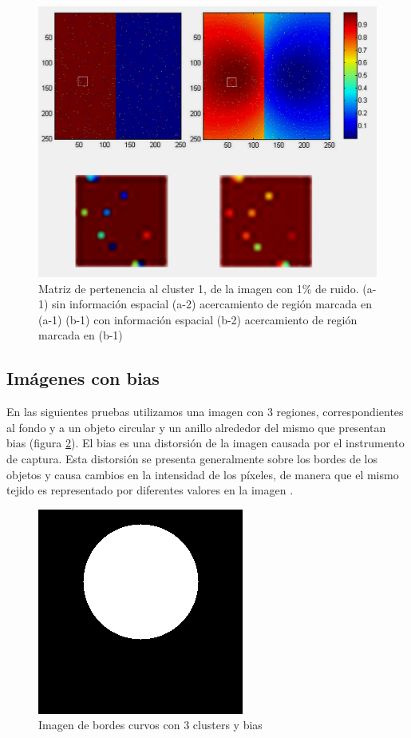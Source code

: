 \begin{figure}[H]
\centering
\includegraphics[scale=0.05]{images/mitad_mitad_ruido_zoom-001.jpg}
\caption{Matriz de pertenencia al cluster 1, de la imagen con 1\% de ruido. 
(a-1) sin información espacial (a-2) acercamiento de región marcada en (a-1)
(b-1) con información espacial (b-2) acercamiento de región marcada en (b-1)}
\label{fig:mitad_mitad_ruido_zoom}
\end{figure}

\subsection{Imágenes con bias}
En las siguientes pruebas utilizamos una imagen con 3 regiones, correspondientes al fondo y a un objeto circular y un anillo alrededor del mismo que presentan bias (figura \ref{fig:circulo_bias}). El bias es una distorsión de la imagen causada por el instrumento de captura. Esta distorsión se presenta generalmente sobre los bordes de los objetos y causa cambios en la intensidad de los píxeles, de manera que el mismo tejido es representado por diferentes valores en la imagen \citep{juntu2005bias}.

\begin{figure}[H]
\centering
\includegraphics[scale=0.3]{images/biasing.png}
\caption{Imagen de bordes curvos con 3 clusters y bias}
\label{fig:circulo_bias}
\end{figure}

